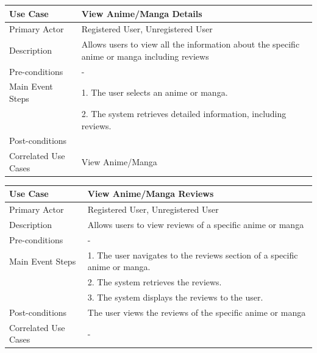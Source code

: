 \newpage

\begin{longtable}{|p{}|p{}|}
    \hline
    \rowcolor{lightblue}
    \textbf{Use Case} & \textbf{View Anime/Manga Details} \\
    \hline
    Primary Actor & Registered User, Unregistered User\\
    \hline
    Description & Allows users to view all the information about the specific anime or manga including reviews\\
    \hline
    Pre-conditions & -\\
    \hline
    Main Event Steps & 1. The user selects an anime or manga. \\
    & 2. The system retrieves detailed information, including reviews. \\
    \hline
    Post-conditions & \\
    \hline
    Correlated Use Cases &View Anime/Manga\\
    \hline
\end{longtable}


\begin{longtable}{|p{}|p{}|}
    \hline
    \rowcolor{lightblue}
    \textbf{Use Case} & \textbf{View Anime/Manga Reviews} \\
    \hline
    Primary Actor & Registered User, Unregistered User\\
    \hline
    Description &Allows users to view reviews of a specific anime or manga\\
    \hline
    Pre-conditions & - \\
    \hline
    Main Event Steps & 1. The user navigates to the reviews section of a specific anime or manga.\\
    & 2. The system retrieves the reviews. \\
    & 3. The system displays the reviews to the user. \\
    \hline
    Post-conditions & The user views the reviews of the specific anime or manga\\
    \hline
    Correlated Use Cases & - \\
    \hline
\end{longtable}


